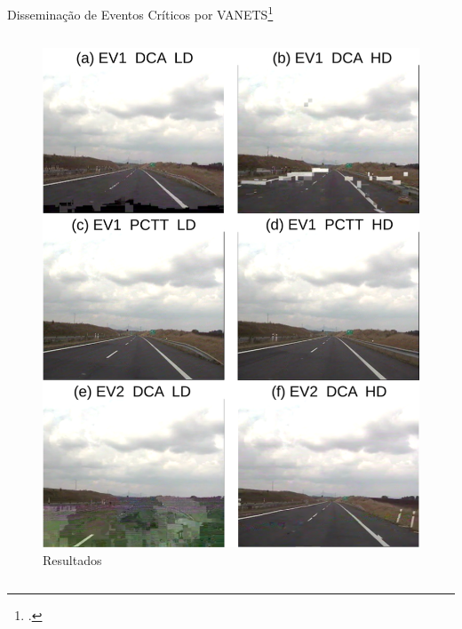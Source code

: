 \begin{frame}{Disseminação de Eventos Críticos por VANETS\footcite{Andrade2021a,Andrade2021b}}
\begin{columns}
\begin{column}{0.35\textwidth}
\begin{figure}
                \includegraphics[width=0.9\linewidth]{figs/minuet_video.png}
                \caption{Resultados}
                \label{fig:enter-label}
            \end{figure}
        \end{column}
    \end{columns}
\end{frame}


